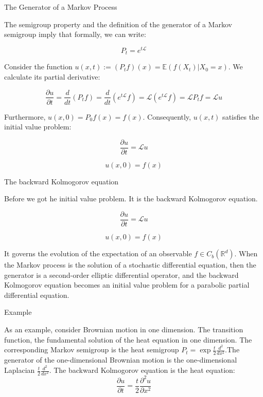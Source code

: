 \documentclass{beamer}%
\theoremstyle{definition}
\newcommand{\R}{\mathbb{R}}
\newcommand{\E}{\mathbb{E}}
\begin{document}
\begin{frame}{The Generator of a Markov Process}

The semigroup property and the definition of the generator of a Markov semigroup imply that formally, we can write:

\[P_t = e^{t\mathscr{L}}\]

Consider the function $u(x,t) := (P_t f)(x) = \E(f(X_t)|X_0 = x)$. We calculate its partial
derivative:

\[\frac{\partial u}{\partial t} = \frac{d}{dt}(P_t f) = \frac{d}{dt}(e^{t\mathscr{L}} f) = \mathscr{L} (e^{t\mathscr{L}} f) =\mathscr{L} P_t f = \mathscr{L} u \]

Furthermore, $u(x,0) = P_0 f(x) = f(x)$. Consequently, $u(x,t)$ satisfies the initial value
problem:

$$\frac{\partial u}{\partial t} = \mathscr{L} u$$

$$u(x, 0) = f(x)$$
    
\end{frame}

\begin{frame}{The backward Kolmogorov equation}

Before we got he initial value
problem. It is the backward Kolmogorov equation.

$$\frac{\partial u}{\partial t} = \mathscr{L} u$$

$$u(x, 0) = f(x)$$

It governs the evolution of
the expectation of an observable $f \in C_b(\R^d)$. When the Markov
process is the solution of a stochastic differential equation, then the generator is a
second-order elliptic differential operator, and the backward Kolmogorov equation
becomes an initial value problem for a parabolic partial differential equation.
    
\end{frame}

\begin{frame}{Example}

\begin{example}
As an example, consider Brownian motion in one dimension. The transition function, the fundamental solution of the heat equation in one dimension. The corresponding Markov semigroup is the heat semigroup 
$P_t = \exp{\frac{t}{2}\frac{d^2}{dx^2}}$.The generator of the one-dimensional Brownian motion is the one-dimensional
Laplacian $\frac{t}{2}\frac{d^2}{dx^2}$. The backward Kolmogorov equation is the heat equation:
\[\frac{\partial u}{\partial t} = \frac{t}{2}\frac{\partial^2u}{\partial x^2}\]
\end{example}
    
\end{frame}
\end{document}
